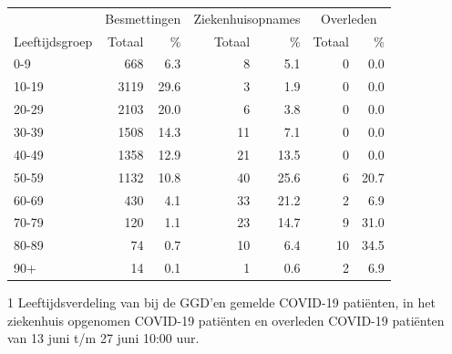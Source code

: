 \documentclass[
  english,
  man,floatsintext]{apa6}
\begin{document}
\begin{table}
\centering\begingroup\fontsize{11}{13}\selectfont

\begin{threeparttable}
\begin{tabular}{lrrrrrr}
\toprule
\multicolumn{1}{c}{ } & \multicolumn{2}{c}{Besmettingen} & \multicolumn{2}{c}{Ziekenhuisopnames} & \multicolumn{2}{c}{Overleden} \\
\cmidrule(l{3pt}r{3pt}){2-3} \cmidrule(l{3pt}r{3pt}){4-5} \cmidrule(l{3pt}r{3pt}){6-7}
Leeftijdsgroep & Totaal & \% & Totaal & \% & Totaal & \%\\
\midrule
0-9 & 668 & 6.3 & 8 & 5.1 & 0 & 0.0\\
10-19 & 3119 & 29.6 & 3 & 1.9 & 0 & 0.0\\
20-29 & 2103 & 20.0 & 6 & 3.8 & 0 & 0.0\\
30-39 & 1508 & 14.3 & 11 & 7.1 & 0 & 0.0\\
40-49 & 1358 & 12.9 & 21 & 13.5 & 0 & 0.0\\
50-59 & 1132 & 10.8 & 40 & 25.6 & 6 & 20.7\\
60-69 & 430 & 4.1 & 33 & 21.2 & 2 & 6.9\\
70-79 & 120 & 1.1 & 23 & 14.7 & 9 & 31.0\\
80-89 & 74 & 0.7 & 10 & 6.4 & 10 & 34.5\\
90+ & 14 & 0.1 & 1 & 0.6 & 2 & 6.9\\
\bottomrule
\end{tabular}
\begin{tablenotes}
\item[1] Leeftijdsverdeling van bij de GGD’en gemelde COVID-19 patiënten, in het ziekenhuis opgenomen COVID-19 patiënten en overleden COVID-19 patiënten van 13 juni t/m 27 juni 10:00 uur.
\end{tablenotes}
\end{threeparttable}
\endgroup{}
\end{table}

\newpage
\end{document}
